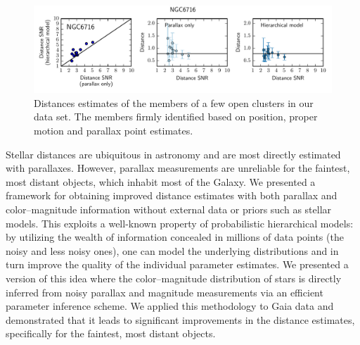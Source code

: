 \documentclass[manuscript, letterpaper]{aastex6}
\makeatletter
\let\origsection\section
\renewcommand\section{\@ifstar{\starsection}{\nostarsection}}
\newcommand\nostarsection[1]{\sectionprelude\origsection{#1}}
\newcommand\starsection[1]{\sectionprelude\origsection*{#1}}
\newcommand\sectionprelude{\vspace{1em}}
\makeatother
\begin{document}
\begin{figure}
\hspace*{-3mm}\includegraphics[width=15.5cm, trim = 0cm 0cm 0cm 0.6cm, clip]{NGC6716_metrics}
\caption{Distances estimates of the members of a few open clusters in our data set. The members firmly identified based on position, proper motion and parallax point estimates. }
\label{fig:oc_metrics}
\end{figure}


\section{Conclusion}\label{sec:concl}

Stellar distances are ubiquitous in astronomy and are most directly estimated with parallaxes. 
However, parallax measurements are unreliable for the faintest, most distant objects, which inhabit most of the Galaxy. 
We presented a framework for obtaining improved distance estimates with both parallax and color--magnitude information without external data or priors such as stellar models. 
This exploits a well-known property of probabilistic hierarchical models: by utilizing the wealth of information concealed in millions of data points (the noisy and less noisy ones), one can model the underlying distributions and in turn improve the quality of the individual parameter estimates. 
We presented a version of this idea where the color--magnitude distribution of stars is directly inferred from noisy parallax and magnitude measurements via an efficient parameter inference scheme.
We applied this methodology to Gaia data and demonstrated that it leads to significant improvements in the distance estimates, specifically for the faintest, most distant objects.
\end{document}

